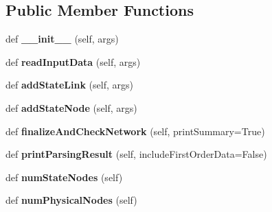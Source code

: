\subsection*{Public Member Functions}
\begin{DoxyCompactItemize}
\item 
\mbox{\label{classinfomapfolder_1_1infomap_1_1MemNetwork_ab5b9cc2958342e91839ed3cf3d2962a6}} 
def {\bfseries \+\_\+\+\_\+init\+\_\+\+\_\+} (self, args)
\item 
\mbox{\label{classinfomapfolder_1_1infomap_1_1MemNetwork_a46c05faf889e954946a660d1a2a2e435}} 
def {\bfseries read\+Input\+Data} (self, args)
\item 
\mbox{\label{classinfomapfolder_1_1infomap_1_1MemNetwork_ac2e274ef4ffe16e7769548e6e49709eb}} 
def {\bfseries add\+State\+Link} (self, args)
\item 
\mbox{\label{classinfomapfolder_1_1infomap_1_1MemNetwork_a2effbd901049ee25c0c8039ef6aee9d1}} 
def {\bfseries add\+State\+Node} (self, args)
\item 
\mbox{\label{classinfomapfolder_1_1infomap_1_1MemNetwork_af28b8c6dff61fb42116838de712c2cb5}} 
def {\bfseries finalize\+And\+Check\+Network} (self, print\+Summary=True)
\item 
\mbox{\label{classinfomapfolder_1_1infomap_1_1MemNetwork_ad8bd779d083110f069c710e61116349f}} 
def {\bfseries print\+Parsing\+Result} (self, include\+First\+Order\+Data=False)
\item 
\mbox{\label{classinfomapfolder_1_1infomap_1_1MemNetwork_a5a1a863b609aae7183375f1a6941f3bf}} 
def {\bfseries num\+State\+Nodes} (self)
\item 
\mbox{\label{classinfomapfolder_1_1infomap_1_1MemNetwork_a415abe6594371dc26a74acb1139b2b89}} 
def {\bfseries num\+Physical\+Nodes} (self)
\item 

\end{DoxyCompactItemize}

